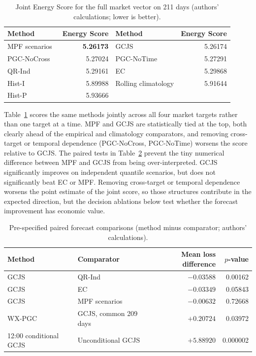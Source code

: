 \documentclass[11pt,a4paper]{article}
\begin{document}
\begin{table}[htbp]
  \centering
  \small
  \caption{Joint Energy Score for the full market vector on 211 days
  (authors' calculations; lower is better).}
  \begin{tabular}{lr@{\hspace{2.5em}}lr}
    \toprule
    Method & Energy Score & Method & Energy Score \\
    \midrule
    MPF scenarios~\cite{allawati2021} & \textbf{5.26173}
      & GCJS & 5.26174 \\
    PGC-NoCross & 5.27024
      & PGC-NoTime & 5.27291 \\
    QR-Ind & 5.29161
      & EC & 5.29868 \\
    Hist-I & 5.89988
      & Rolling climatology & 5.91644 \\
    Hist-P & 5.93666
      & & \\
    \bottomrule
  \end{tabular}
  \label{tab:joint-forecast-results}
\end{table}

Table~\ref{tab:joint-forecast-results} scores the same methods jointly across
all four market targets rather than one target at a time.  MPF and GCJS are
statistically tied at the top, both clearly ahead of the empirical and
climatology comparators, and removing cross-target or temporal dependence
(PGC-NoCross, PGC-NoTime) worsens the score relative to GCJS.  The paired
tests in Table~\ref{tab:forecast-significance} prevent the tiny
numerical difference between MPF and GCJS from being over-interpreted.  GCJS
significantly improves on independent quantile scenarios, but does not
significantly beat EC or MPF.  Removing cross-target or temporal dependence
worsens the point estimate of the joint score, so those structures contribute
in the expected direction, but the decision ablations below test whether the
forecast improvement has economic value.

\begin{table}[htbp]
  \centering
  \small
  \caption{Pre-specified paired forecast comparisons (method minus comparator;
  authors' calculations).}
  \begin{tabular}{llrr}
    \toprule
    Method & Comparator & Mean loss difference & $p$-value \\
    \midrule
    GCJS & QR-Ind & $-0.03588$ & 0.00162 \\
    GCJS & EC & $-0.03349$ & 0.05843 \\
    GCJS & MPF scenarios~\cite{allawati2021} & $-0.00632$ & 0.72668 \\
    WX-PGC & GCJS, common 209 days & $+0.20724$ & 0.03972 \\
    12:00 conditional GCJS & Unconditional GCJS & $+5.88920$ & 0.000002 \\
    \bottomrule
  \end{tabular}
  \label{tab:forecast-significance}
\end{table}
\end{document}
